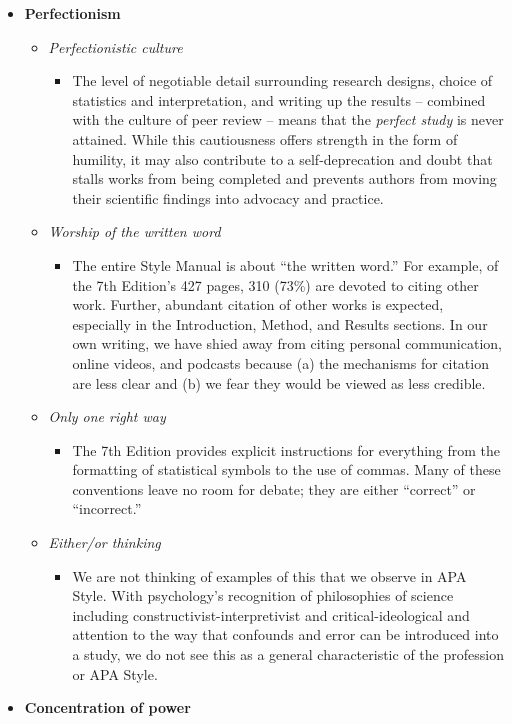 \documentclass[
  11pt,
]{book}
\providecommand{\tightlist}{%
  \setlength{\itemsep}{0pt}\setlength{\parskip}{0pt}}
\begin{document}
\begin{itemize}
\tightlist
\item
  \textbf{Perfectionism}

  \begin{itemize}
  \tightlist
  \item
    \emph{Perfectionistic culture}

    \begin{itemize}
    \tightlist
    \item
      The level of negotiable detail surrounding research designs, choice of statistics and interpretation, and writing up the results -- combined with the culture of peer review -- means that the \emph{perfect study} is never attained. While this cautiousness offers strength in the form of humility, it may also contribute to a self-deprecation and doubt that stalls works from being completed and prevents authors from moving their scientific findings into advocacy and practice.
    \end{itemize}
  \item
    \emph{Worship of the written word}

    \begin{itemize}
    \tightlist
    \item
      The entire Style Manual is about ``the written word.'' For example, of the 7th Edition's 427 pages, 310 (73\%) are devoted to citing other work. Further, abundant citation of other works is expected, especially in the Introduction, Method, and Results sections. In our own writing, we have shied away from citing personal communication, online videos, and podcasts because (a) the mechanisms for citation are less clear and (b) we fear they would be viewed as less credible.
    \end{itemize}
  \item
    \emph{Only one right way}

    \begin{itemize}
    \tightlist
    \item
      The 7th Edition provides explicit instructions for everything from the formatting of statistical symbols to the use of commas. Many of these conventions leave no room for debate; they are either ``correct'' or ``incorrect.''
    \end{itemize}
  \item
    \emph{Either/or thinking}

    \begin{itemize}
    \tightlist
    \item
      We are not thinking of examples of this that we observe in APA Style. With psychology's recognition of philosophies of science including constructivist-interpretivist and critical-ideological and attention to the way that confounds and error can be introduced into a study, we do not see this as a general characteristic of the profession or APA Style.
    \end{itemize}
  \end{itemize}
\item
  \textbf{Concentration of power}


\end{itemize}
\end{document}
